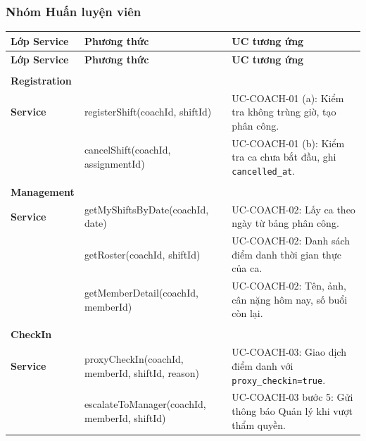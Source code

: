 \subsubsection*{Nhóm Huấn luyện viên}

\begingroup
\renewcommand{\arraystretch}{1.3}
\begin{longtable}{|>{\centering\arraybackslash}m{2.8cm}|>{\sloppy\small\ttfamily\raggedright\arraybackslash}p{7cm}|>{\raggedright\arraybackslash}m{4.5cm}|}
\hline
\textbf{Lớp Service} & \normalfont\normalsize\textbf{Phương thức} & \textbf{UC tương ứng} \\ \hline
\endfirsthead
\hline
\textbf{Lớp Service} & \normalfont\normalsize\textbf{Phương thức} & \textbf{UC tương ứng} \\ \hline
\endhead
\hline
\endfoot

\multirow{2}{*}{\makecell{\textbf{Shift}\\\textbf{Registration}\\\textbf{Service}}} &
  registerShift(coachId, shiftId) &
  UC-COACH-01 (a): Kiểm tra không trùng giờ, tạo phân công. \\ \cline{2-3}
& cancelShift(coachId, assignmentId) &
  UC-COACH-01 (b): Kiểm tra ca chưa bắt đầu, ghi \texttt{cancelled\_at}. \\ \hline

\multirow{3}{*}{\makecell{\textbf{Shift}\\\textbf{Management}\\\textbf{Service}}} &
  getMyShiftsByDate(coachId, date) &
  UC-COACH-02: Lấy ca theo ngày từ bảng phân công. \\ \cline{2-3}
& getRoster(coachId, shiftId) &
  UC-COACH-02: Danh sách điểm danh thời gian thực của ca. \\ \cline{2-3}
& getMemberDetail(coachId, memberId) &
  UC-COACH-02: Tên, ảnh, cân nặng hôm nay, số buổi còn lại. \\ \hline

\multirow{2}{*}{\makecell{\textbf{Proxy}\\\textbf{CheckIn}\\\textbf{Service}}} &
  proxyCheckIn(coachId, memberId, shiftId, reason) &
  UC-COACH-03: Giao dịch điểm danh với \texttt{proxy\_checkin=true}. \\ \cline{2-3}
& escalateToManager(coachId, memberId, shiftId) &
  UC-COACH-03 bước 5: Gửi thông báo Quản lý khi vượt thẩm quyền. \\ \hline

\end{longtable}
\endgroup

